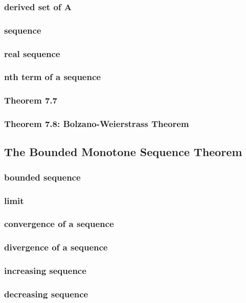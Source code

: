 \documentclass[a4paper]{article}
\begin{document}
\subsubsection*{derived set of A}
\subsubsection*{sequence}
\subsubsection*{real sequence}
\subsubsection*{nth term of a sequence}
\subsubsection*{Theorem 7.7}
\subsubsection*{Theorem 7.8: Bolzano-Weierstrass Theorem}

\newpage
\subsection{The Bounded Monotone Sequence Theorem}   %
\subsubsection*{bounded sequence}
\subsubsection*{limit}
\subsubsection*{convergence of a sequence}
\subsubsection*{divergence of a sequence}
\subsubsection*{increasing sequence}
\subsubsection*{decreasing sequence}
\end{document}
